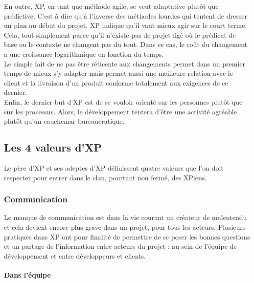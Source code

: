 \documentclass[]{article}
\let\oldparagraph\paragraph
\renewcommand{\paragraph}[1]{\oldparagraph{#1}\mbox{}}
\begin{document}
En outre, XP, en tant que méthode agile, se veut adaptative plutôt que
prédictive. C'est à dire qu'à l'inverse des méthodes lourdes qui tentent
de dresser un plan au début du projet, XP indique qu'il vaut mieux agir
sur le court terme. Cela, tout simplement parce qu'il n'existe pas de
projet figé où le prédicat de base ou le contexte ne changent pas du
tout. Dans ce cas, le coût du changement a une croissance logarithmique
en fonction du temps.\\
Le simple fait de ne pas être réticente aux changements permet dans un
premier temps de mieux s'y adapter mais permet aussi une meilleure
relation avec le client et la livraison d'un produit conforme totalement
aux exigences de ce dernier.\\
Enfin, le dernier but d'XP est de se vouloir orienté sur les personnes
plutôt que sur les processus. Alors, le développement tentera d'être une
activité agréable plutôt qu'un cauchemar bureaucratique.


\hypertarget{les-4-valeurs-dxp}{%
\subsection{\texorpdfstring{\textbf{Les 4 valeurs
d'XP}}{Les 4 valeurs d'XP}}\label{les-4-valeurs-dxp}}

Le père d'XP et ses adeptes d'XP définissent quatre valeurs que l'on
doit respecter pour entrer dans le clan, pourtant non fermé, des XPiens.


\hypertarget{communication}{%
\subsubsection{Communication}\label{communication}}

Le manque de communication est dans la vie courant un créateur de
malentendu et cela devient encore plus grave dans un projet, pour tous
les acteurs. Plusieurs pratiques dans XP ont pour finalité de permettre
de se poser les bonnes questions et un partage de l'information entre
acteurs du projet : au sein de l'équipe de développement et entre
développeurs et clients.


\hypertarget{dans-luxe9quipe}{%
\paragraph{Dans l'équipe}\label{dans-luxe9quipe}}
\end{document}
